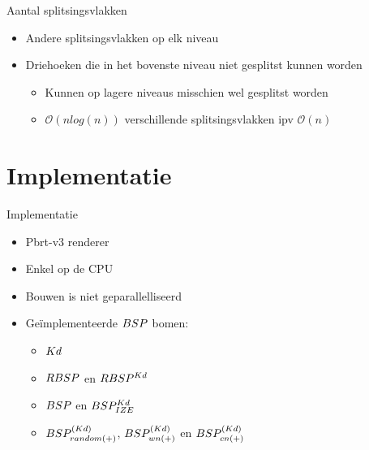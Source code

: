 \documentclass[11pt,t]{beamer}
\begin{document}
\begin{frame}{Aantal splitsingsvlakken}
	\begin{itemize}
		\item Andere splitsingsvlakken op elk niveau
	\end{itemize}
\begin{itemize}
	\item Driehoeken die in het bovenste niveau niet gesplitst kunnen worden
	\begin{itemize}
		\item Kunnen op lagere niveaus misschien wel gesplitst worden
		\item $\mathcal{O}(nlog(n))$ verschillende splitsingsvlakken ipv $\mathcal{O}(n)$
	\end{itemize}
\end{itemize}
\end{frame}

\section{Implementatie}

\begin{frame}{Implementatie}
	\begin{itemize}
		\item Pbrt-v3 renderer
		\item Enkel op de CPU
		\item Bouwen is niet geparallelliseerd
		\item Geïmplementeerde $BSP$ bomen:
			\begin{itemize}
				\item $Kd$
				\item $RBSP$ en $RBSP^{Kd}$
				\item $BSP$ en $BSP^{Kd}_{IZE}$
				\item $BSP^{(Kd)}_{random(+)}$, $BSP^{(Kd)}_{wn(+)}$ en $BSP^{(Kd)}_{cn(+)}$				
			\end{itemize}
	\end{itemize}
\end{frame}
\end{document}
